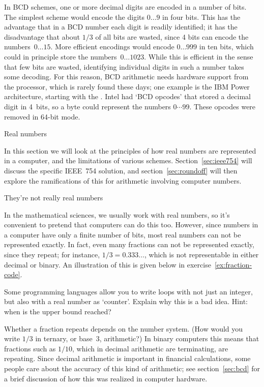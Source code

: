 In BCD schemes, one or more decimal digits are encoded in a number of
bits. The simplest scheme would encode the digits $0\ldots9$ in four
bits. This has the advantage that in a
BCD number each digit is readily identified; it has the disadvantage
that about $1/3$ of all bits are wasted, since 4 bits can
encode the numbers~$0\ldots15$.
%
More efficient encodings would encode $0\ldots999$ in ten bits, which
could in principle store the numbers~$0\ldots1023$. While this is
efficient in the sense that few bits are wasted, identifying
individual digits in such a number takes some decoding. For this
reason, BCD arithmetic needs hardware support from the processor,
which is rarely found these days; one example is the IBM
Power architecture, starting with the .
Intel had `BCD opcodes' that stored a decimal digit in 4~bits,
so a byte could represent the numbers $0\cdots 99$.
These opcodes were removed in 64-bit mode.

 {Real numbers}
\label{sec:real-numbers}

In this section we will look at the principles of how real numbers are
represented in a computer, and the limitations of various schemes.
Section~\ref{sec:ieee754} will discuss the specific IEEE~754
solution, and
section~\ref{sec:roundoff} will then explore the ramifications of this for arithmetic
involving computer numbers.

 {They're not really real numbers}
\label{sec:arith-intro}

In the mathematical sciences, we usually work with real numbers, so
it's convenient to pretend that computers can do this too. However,
since numbers in a computer have only a finite number of bits, most
real numbers can not be represented exactly. In fact, even many
fractions can not be represented exactly, since they repeat; for
instance, $1/3=0.333\ldots$, which is not representable in either
decimal or binary. An illustration of this is given below
in exercise~\ref{ex:fraction-code}.

\begin{exercise}
  Some programming languages allow you to write loops with not just an
  integer, but also with a real number as `counter'. Explain why this
  is a bad idea. Hint: when is the upper bound reached?
\end{exercise}

Whether a fraction repeats depends on the number system. (How would
you write $1/3$ in ternary, or base~3, arithmetic?) In binary computers
this means that fractions such as $1/10$, which in decimal arithmetic
are terminating, are repeating. Since decimal arithmetic is important
in financial calculations, some
people care about the accuracy of this kind of arithmetic;
see section~\ref{sec:bcd} for a brief discussion
of how this was realized in computer hardware.

